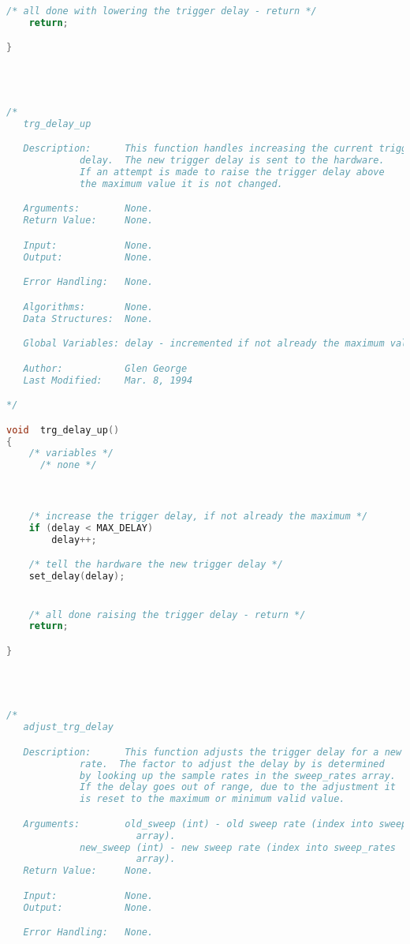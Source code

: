 \begin{lstlisting}[language=C]
    /* all done with lowering the trigger delay - return */
    return;

}




/*
   trg_delay_up

   Description:      This function handles increasing the current trigger
   		     delay.  The new trigger delay is sent to the hardware.
		     If an attempt is made to raise the trigger delay above
		     the maximum value it is not changed.

   Arguments:        None.
   Return Value:     None.

   Input:            None.
   Output:           None.

   Error Handling:   None.

   Algorithms:       None.
   Data Structures:  None.

   Global Variables: delay - incremented if not already the maximum value.

   Author:           Glen George
   Last Modified:    Mar. 8, 1994

*/

void  trg_delay_up()
{
    /* variables */
      /* none */



    /* increase the trigger delay, if not already the maximum */
    if (delay < MAX_DELAY)
        delay++;

    /* tell the hardware the new trigger delay */
    set_delay(delay);


    /* all done raising the trigger delay - return */
    return;

}




/*
   adjust_trg_delay

   Description:      This function adjusts the trigger delay for a new sweep
   		     rate.  The factor to adjust the delay by is determined
		     by looking up the sample rates in the sweep_rates array.
		     If the delay goes out of range, due to the adjustment it
		     is reset to the maximum or minimum valid value.

   Arguments:        old_sweep (int) - old sweep rate (index into sweep_rates
   				       array).
		     new_sweep (int) - new sweep rate (index into sweep_rates
   				       array).
   Return Value:     None.

   Input:            None.
   Output:           None.

   Error Handling:   None.


\end{lstlisting}
